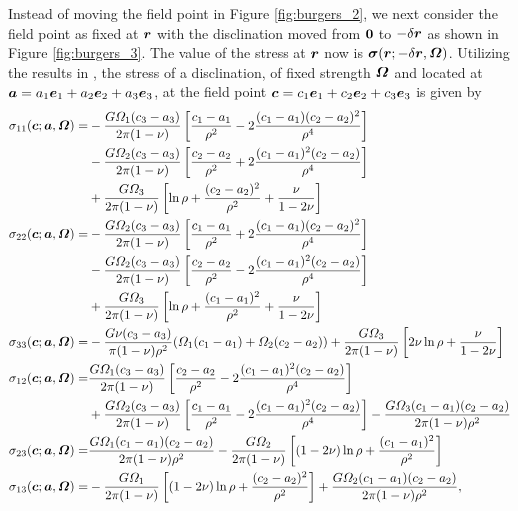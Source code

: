 \documentclass[11pt,letterpaper]{article}
\begin{document}
Instead of moving the field point in Figure \ref{fig:burgers_2}, we next consider the field point as fixed at $\bfr$ with the disclination moved from $\bf0$ to $-\delta\bfr$ as shown in Figure \ref{fig:burgers_3}. The value of the stress at $\bfr$ now is $\bfsigma(\bfr;-\delta\bfr,\bfOmega)$.  Utilizing the results in \cite{dewit1973theory}, the stress  of a disclination, of fixed strength $\bfOmega$ and located at $\bfa=a_1\bfe_1+a_2\bfe_2+a_3\bfe_3$, at the field point $\bfc= c_1\bfe_1 + c_2\bfe_2 + c_3\bfe_3$ is given by
\begin{equation}\label{eqn:classical_stress}
\begin{aligned}
\sigma_{11}(\bfc; \bfa, \bfOmega) =& -\frac{G\Omega_1(c_3-a_3)}{2\pi(1-\nu)}\left[ \frac{c_1-a_1}{\rho^2}- 2 \frac{(c_1-a_1)(c_2-a_2)^2}{\rho^4}\right] \\
& - \frac{G\Omega_2(c_3-a_3)}{2\pi(1-\nu)}\left[\frac{c_2-a_2}{\rho^2}+ 2\frac{(c_1-a_1)^2(c_2-a_2)}{\rho^4}\right]\\
& + \frac{G\Omega_3}{2\pi(1-\nu)}\left[ \ln \rho + \frac{(c_2-a_2)^2}{\rho^2} + \frac{\nu}{1-2\nu}\right]\\
\sigma_{22}(\bfc; \bfa, \bfOmega) =& -\frac{G\Omega_2(c_3-a_3)}{2\pi(1-\nu)}\left[ \frac{c_1-a_1}{\rho^2}+ 2 \frac{(c_1-a_1)(c_2-a_2)^2}{\rho^4}\right] \\
&- \frac{G\Omega_2(c_3-a_3)}{2\pi(1-\nu)}\left[\frac{c_2-a_2}{\rho^2}- 2\frac{(c_1-a_1)^2(c_2-a_2)}{\rho^4}\right] \\
& + \frac{G\Omega_3}{2\pi(1-\nu)}\left[ \ln \rho + \frac{(c_1-a_1)^2}{\rho^2} + \frac{\nu}{1-2\nu}\right]\\
\sigma_{33}(\bfc; \bfa, \bfOmega) =& -\frac{G\nu (c_3-a_3)}{\pi(1-\nu)\rho^2}(\Omega_1(c_1-a_1)+\Omega_2(c_2-a_2))+\frac{G\Omega_3}{2\pi(1-\nu)}\left[2\nu \ln \rho + \frac{\nu}{1-2\nu} \right] \\
\sigma_{12}(\bfc; \bfa, \bfOmega) =& \frac{G\Omega_1(c_3-a_3)}{2\pi(1-\nu)}\left[ \frac{c_2-a_2}{\rho^2}- 2 \frac{(c_1-a_1)^2(c_2-a_2)}{\rho^4}\right] \\
& + \frac{G\Omega_2(c_3-a_3)}{2\pi(1-\nu)}\left[\frac{c_1-a_1}{\rho^2}- 2\frac{(c_1-a_1)^2(c_2-a_2)}{\rho^4}\right] - \frac{G\Omega_3(c_1-a_1)(c_2-a_2)}{2\pi(1-\nu)\rho^2}\\
\sigma_{23}(\bfc; \bfa, \bfOmega) =& \frac{G\Omega_1(c_1-a_1)(c_2-a_2)}{2\pi(1-\nu)\rho^2} - \frac{G\Omega_2}{2\pi(1-\nu)} \left[ (1-2\nu) \ln \rho + \frac{(c_1-a_1)^2}{\rho^2}\right] \\
\sigma_{13}(\bfc; \bfa, \bfOmega) =& -\frac{G\Omega_1}{2\pi(1-\nu)}\left[ (1-2\nu) \ln \rho +\frac{(c_2-a_2)^2}{\rho^2} \right] + \frac{G\Omega_2(c_1-a_1)(c_2-a_2)}{2\pi (1-\nu)\rho^2},
\end{aligned}
\end{equation}
\end{document}
